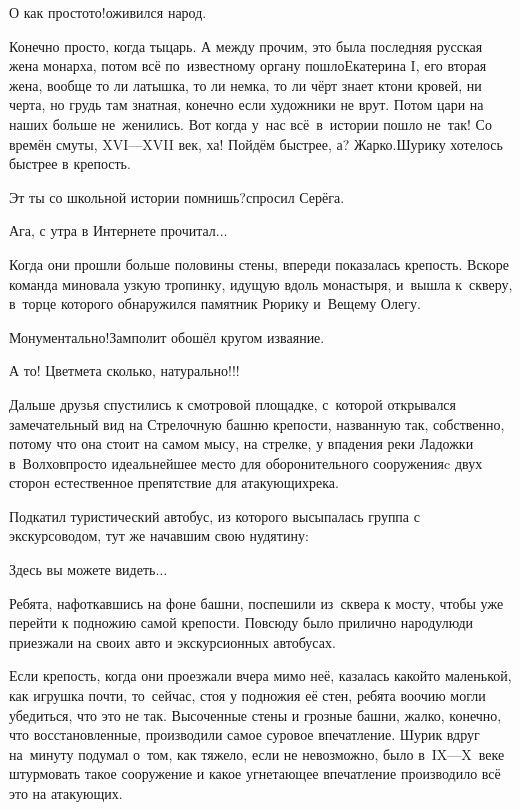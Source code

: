 \diagdash О как просто\sdash то!\mdash оживился народ.

\diagdash Конечно просто, когда ты\mdash царь. А между прочим, это была последняя русская жена монарха, потом всё по~известному органу пошло\mdash Екатерина I, его вторая жена, вообще то ли латышка, то ли немка, то ли чёрт знает кто\mdash ни кровей, ни черта, но грудь там знатная, конечно если художники не врут. Потом цари на наших больше не~женились. Вот когда у~нас всё~в~истории пошло не~так! Со времён смуты, XVI\thinspace\nobreakdash---\thinspace XVII век, ха! Пойдём быстрее, а? Жарко.\mdash Шурику  хотелось быстрее в крепость.

\diagdash Эт ты со школьной истории помнишь?\mdash спросил Серёга.

\diagdash Ага, с утра в Интернете прочитал$\ldots$

Когда они прошли больше половины стены, впереди показалась крепость. Вскоре команда миновала узкую тропинку, идущую вдоль монастыря, и~вышла к~скверу, в~торце которого обнаружился памятник Рюрику и~Вещему Олегу. 

\diagdash Монументально!\mdash Замполит обошёл кругом изваяние.

\diagdash А то! Цветмета сколько, натурально!!!

Дальше друзья спустились к смотровой площадке, с~которой открывался замечательный вид на Стрелочную башню крепости, названную так, собственно, потому что она стоит на самом мысу, на стрелке, у впадения реки Ладожки в~Волхов\mdash просто идеальнейшее место для оборонительного сооружения\mdash c двух сторон естественное препятствие для атакующих\mdash река.

Подкатил туристический автобус, из которого высыпалась группа с экскурсоводом, тут же начавшим свою нудятину:

\diagdash Здесь вы можете видеть$\ldots$

Ребята, нафоткавшись на фоне башни, поспешили из~сквера к мосту, чтобы уже перейти к подножию самой крепости. Повсюду было прилично народу\mdash люди приезжали на своих авто и экскурсионных автобусах.

Если крепость, когда они проезжали вчера мимо неё, казалась какой\sdash то маленькой, как игрушка почти, то~сейчас, стоя у подножия её стен, ребята воочию могли убедиться, что это не так. Высоченные стены и грозные башни, жалко, конечно, что восстановленные, производили самое суровое впечатление. Шурик вдруг на~минуту подумал о~том, как тяжело, если не невозможно, было в~IX\thinspace\nobreakdash---\thinspace X~веке штурмовать такое сооружение и какое угнетающее впечатление производило всё это на атакующих.

